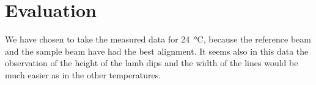 
\chapter{Evaluation}
\label{chap:eval}
We have chosen to take the measured data for \SI{24}{\celsius}, because the reference beam and the sample beam have had the best alignment. It seems also in this data the observation of the height of the lamb dips and the width of the lines would be much easier as in the other temperatures.








